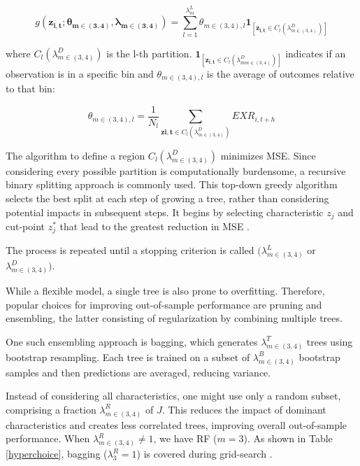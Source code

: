 \documentclass[preprint,12pt,authoryear]{elsarticle}
\begin{document}
\begin{equation}
g(\mathbf{z_{i,t}}; \mathbf{\theta_{m \in (3,4)}}, \mathbf{\lambda_{m \in (3,4)}}) = \sum_{l=1}^{\lambda^{L}_{m}}\theta_{m \in (3,4), l}\mathbf{1}_{[\mathbf{z_{i,t}} \in C_{l}(\lambda^{D}_{m \in (3,4)})]} 
\end{equation}

where $C_{l}(\lambda^{D}_{m \in (3,4)})$ is the l-th  partition. $\mathbf{1}_{[\mathbf{z_{i,t}} \in C_{l}(\lambda^{D}_{m m \in (3,4)})]}$ indicates if an observation is in a specific bin and $\theta_{m \in (3,4), l}$ is the average of outcomes relative to that bin:

\begin{equation}
\theta_{m \in (3,4), l} = \frac{1}{N_{l}}\sum_{\mathbf{z{i,t}}\in  C_{l}(\lambda^{D}_{m \in (3,4)})}{EXR}_{i,t+h}
\end{equation}

The algorithm to define a region $C_{l}(\lambda^{D}_{m \in (3,4)})$ minimizes MSE. Since considering every possible partition is computationally burdensome, a recursive binary splitting approach is commonly used. This top-down greedy algorithm selects the best split at each step of growing a tree, rather than considering potential impacts in subsequent steps. It begins by selecting characteristic $z_{j}$ and cut-point $z^{*}_{j}$ that lead to the greatest reduction in MSE \citep{breiman1984}. 

The process is repeated until a stopping criterion is called  $(\lambda^{L}_{m \in (3,4)}$ or $\lambda^{D}_{m \in (3,4)})$. 

While a flexible model, a single tree is also prone to overfitting. Therefore, popular choices for improving out-of-sample performance are pruning and ensembling, the latter consisting of regularization by combining multiple trees.

One such ensembling approach is bagging, which generates $\lambda^{T}_{m \in (3,4)}$ trees using bootstrap resampling. Each tree is trained on a subset of $\lambda^{B}_{m \in (3,4)}$ bootstrap samples and then predictions are averaged, reducing variance.

Instead of considering all characteristics, one might use only a random subset, comprising a fraction $\lambda^{R}_{m \in (3,4)}$ of $J$. This reduces the impact of dominant characteristics and creates less correlated trees, improving overall out-of-sample performance. When $\lambda^{R}_{m \in (3,4)} \neq 1$, we have RF ($m = 3$). As shown in Table \ref{hyperchoice}, bagging ($\lambda^{R}_{3} = 1$) is covered during grid-search  \citep{breiman2001}.
\end{document}
